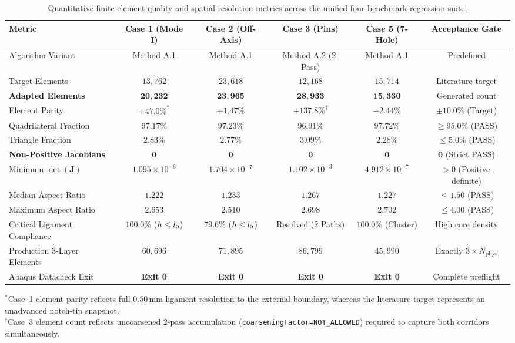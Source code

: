 \begin{table}[htbp]
  \centering
  \small
  \caption{Quantitative finite-element quality and spatial resolution metrics across the unified four-benchmark regression suite.}
  \label{tab:f1774_mesh_audit}
  \begin{tabular}{|l|c|c|c|c|c|}
    \hline
    \textbf{Metric} & \textbf{Case 1 (Mode I)} & \textbf{Case 2 (Off-Axis)} & \textbf{Case 3 (Pins)} & \textbf{Case 5 (7-Hole)} & \textbf{Acceptance Gate} \\
    \hline
    Algorithm Variant & Method A.1 & Method A.1 & Method A.2 (2-Pass) & Method A.1 & Predefined \\
    Target Elements & $13{,}762$ & $23{,}618$ & $12{,}168$ & $15{,}714$ & Literature target \\
    \textbf{Adapted Elements} & $\mathbf{20{,}232}$ & $\mathbf{23{,}965}$ & $\mathbf{28{,}933}$ & $\mathbf{15{,}330}$ & Generated count \\
    Element Parity & $+47.0\%^*$ & $+1.47\%$ & $+137.8\%^\dagger$ & $-2.44\%$ & $\pm 10.0\%$ (Target) \\
    Quadrilateral Fraction & $97.17\%$ & $97.23\%$ & $96.91\%$ & $97.72\%$ & $\ge 95.0\%$ (PASS) \\
    Triangle Fraction & $2.83\%$ & $2.77\%$ & $3.09\%$ & $2.28\%$ & $\le 5.0\%$ (PASS) \\
    \hline
    \textbf{Non-Positive Jacobians} & $\mathbf{0}$ & $\mathbf{0}$ & $\mathbf{0}$ & $\mathbf{0}$ & $\mathbf{0}$ (Strict PASS) \\
    Minimum $\det(\mathbf{J})$ & $1.095 \times 10^{-6}$ & $1.704 \times 10^{-7}$ & $1.102 \times 10^{-3}$ & $4.912 \times 10^{-7}$ & $> 0$ (Positive-definite) \\
    Median Aspect Ratio & $1.222$ & $1.233$ & $1.267$ & $1.227$ & $\le 1.50$ (PASS) \\
    Maximum Aspect Ratio & $2.653$ & $2.510$ & $2.698$ & $2.702$ & $\le 4.00$ (PASS) \\
    \hline
    Critical Ligament Compliance & $\mathbf{100.0\%}$ ($h \le l_0$) & $79.6\%$ ($h \le l_0$) & Resolved (2 Paths) & $\mathbf{100.0\%}$ (Cluster) & High core density \\
    Production 3-Layer Elements & $60{,}696$ & $71{,}895$ & $86{,}799$ & $45{,}990$ & Exactly $3 \times N_{\mathrm{phys}}$ \\
    Abaqus Datacheck Exit & \textbf{Exit 0} & \textbf{Exit 0} & \textbf{Exit 0} & \textbf{Exit 0} & Complete preflight \\
    \hline
  \end{tabular}
  \par\vspace{1ex}
  \footnotesize
  $^*$Case~1 element parity reflects full $0.50\,\mathrm{mm}$ ligament resolution to the external boundary, whereas the literature target represents an unadvanced notch-tip snapshot.\\
  $^\dagger$Case~3 element count reflects uncoarsened 2-pass accumulation (\texttt{coarseningFactor=NOT\_ALLOWED}) required to capture both corridors simultaneously.
\end{table}

